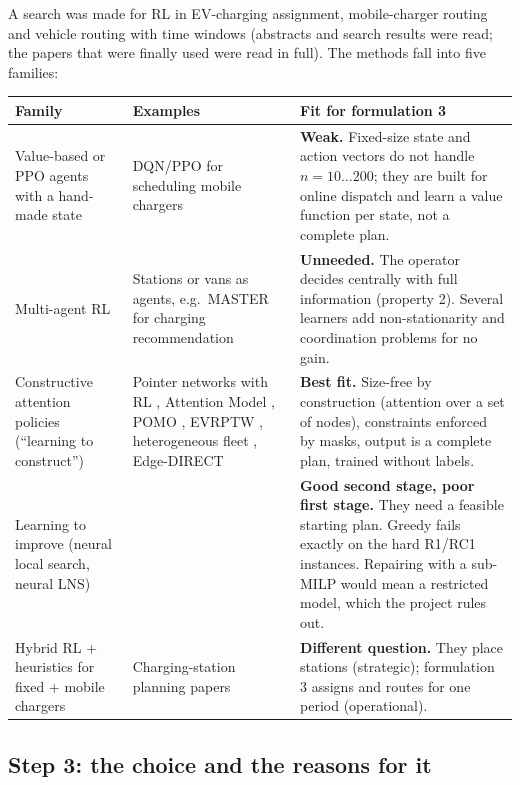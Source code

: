 A search was made for RL in EV-charging assignment, mobile-charger routing and vehicle routing with time windows (abstracts and search results were read; the papers that were finally used were read in full). The methods fall into five families:

{\small
\begin{longtable}{@{}>{\raggedright\arraybackslash}p{3.3cm}>{\raggedright\arraybackslash}p{4.3cm}>{\raggedright\arraybackslash}p{7.7cm}@{}}
\toprule
\textbf{Family} & \textbf{Examples} & \textbf{Fit for formulation 3} \\
\midrule
\endhead
Value-based or PPO agents with a hand-made state & DQN/PPO for scheduling mobile chargers \cite{wang2023} & \textbf{Weak.} Fixed-size state and action vectors do not handle $n=10\ldots200$; they are built for online dispatch and learn a value function per state, not a complete plan. \\
Multi-agent RL & Stations or vans as agents, e.g.\ MASTER for charging recommendation \cite{master2021} & \textbf{Unneeded.} The operator decides centrally with full information (property 2). Several learners add non-stationarity and coordination problems for no gain. \\
Constructive attention policies (``learning to construct'') & Pointer networks with RL \cite{bello2016,nazari2018}, Attention Model \cite{kool2019}, POMO \cite{kwon2020}, EVRPTW \cite{lin2021}, heterogeneous fleet \cite{li2021}, Edge-DIRECT \cite{edgedirect} & \textbf{Best fit.} Size-free by construction (attention over a set of nodes), constraints enforced by masks, output is a complete plan, trained without labels. \\
Learning to improve (neural local search, neural LNS) & \cite{wu2021,hottung2020} & \textbf{Good second stage, poor first stage.} They need a feasible starting plan. Greedy fails exactly on the hard R1/RC1 instances. Repairing with a sub-MILP would mean a restricted model, which the project rules out. \\
Hybrid RL + heuristics for fixed + mobile chargers & Charging-station planning papers & \textbf{Different question.} They place stations (strategic); formulation 3 assigns and routes for one period (operational). \\
\bottomrule
\end{longtable}}

\subsection{Step 3: the choice and the reasons for it}

